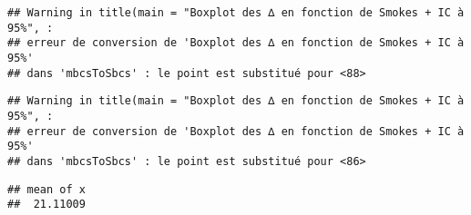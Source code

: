 \documentclass[]{article}
\newenvironment{Shaded}{\begin{snugshade}}{\end{snugshade}}
\newcommand{\KeywordTok}[1]{\textcolor[rgb]{0.13,0.29,0.53}{\textbf{#1}}}
\newcommand{\DataTypeTok}[1]{\textcolor[rgb]{0.13,0.29,0.53}{#1}}
\newcommand{\DecValTok}[1]{\textcolor[rgb]{0.00,0.00,0.81}{#1}}
\newcommand{\FloatTok}[1]{\textcolor[rgb]{0.00,0.00,0.81}{#1}}
\newcommand{\StringTok}[1]{\textcolor[rgb]{0.31,0.60,0.02}{#1}}
\newcommand{\OperatorTok}[1]{\textcolor[rgb]{0.81,0.36,0.00}{\textbf{#1}}}
\newcommand{\NormalTok}[1]{#1}
\begin{document}
\begin{verbatim}
## Warning in title(main = "Boxplot des ∆ en fonction de Smokes + IC à 95%", :
## erreur de conversion de 'Boxplot des ∆ en fonction de Smokes + IC à 95%'
## dans 'mbcsToSbcs' : le point est substitué pour <88>
\end{verbatim}

\begin{verbatim}
## Warning in title(main = "Boxplot des ∆ en fonction de Smokes + IC à 95%", :
## erreur de conversion de 'Boxplot des ∆ en fonction de Smokes + IC à 95%'
## dans 'mbcsToSbcs' : le point est substitué pour <86>
\end{verbatim}

\begin{Shaded}
\end{Shaded}

\begin{verbatim}
## mean of x 
##  21.11009
\end{verbatim}

\begin{Shaded}
\end{Shaded}
\end{document}
